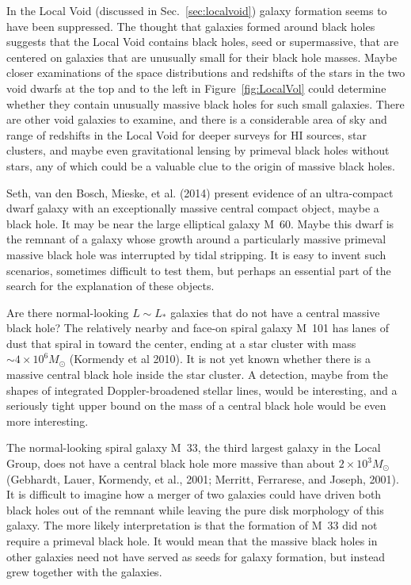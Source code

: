 \documentclass[fleqn,12pt]{article}
\begin{document}
In the Local Void (discussed in Sec.~\ref{sec:localvoid}) galaxy formation seems to have been  suppressed. The thought that galaxies formed around black holes suggests that the Local Void contains black holes, seed or supermassive, that are centered on galaxies that are unusually small for their black hole masses. Maybe closer examinations of the space distributions and redshifts of the stars in the two void dwarfs at the top and to the left in Figure~\ref{fig:LocalVol}  could determine whether they contain unusually massive black holes for such small galaxies. There are other void galaxies to examine, and there is a considerable area of sky and range of redshifts in the Local Void for deeper surveys for HI sources, star clusters, and maybe even gravitational lensing by primeval black holes without stars, any of which could be a valuable clue to the origin of massive black holes.  

Seth, van den Bosch, Mieske, et al. (2014) present evidence of an ultra-compact dwarf galaxy with an exceptionally massive central compact object, maybe a black hole. It may be near the large elliptical galaxy M~60. Maybe this dwarf is the remnant of a galaxy whose growth around a particularly massive primeval massive black hole was interrupted by tidal stripping. It is easy to invent such scenarios, sometimes difficult to test them, but perhaps an essential part of the search for the explanation of these objects.

Are there normal-looking $L\sim L_\ast$ galaxies that do not have a central massive black hole? The relatively nearby and face-on spiral galaxy M~101 has lanes of dust that spiral in toward the center, ending at a star cluster with mass $\sim 4\times 10^6M_\odot$ (Kormendy et al 2010). It is not yet known whether there is a massive central black hole inside the star cluster. A detection, maybe from the shapes of integrated Doppler-broadened stellar lines, would be interesting, and a seriously tight upper bound on the mass of a central black hole would be even more interesting. 

The normal-looking spiral galaxy M~33, the third largest galaxy in the Local Group, does not have a central black hole more massive than about $2\times 10^3M_\odot$ (Gebhardt, Lauer, Kormendy, et al., 2001; Merritt, Ferrarese, and Joseph, 2001). It is difficult to imagine how a merger of two galaxies could have driven both black holes out of the remnant while leaving the pure disk morphology of this galaxy. The more likely interpretation is that the formation of M~33 did not require a primeval black hole. It would mean that the massive black holes in other galaxies need not have served as seeds for galaxy formation, but instead grew together with the galaxies. 
\end{document}
